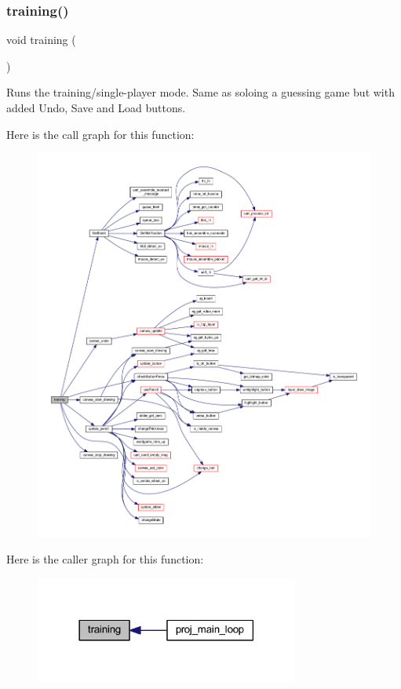 \subsubsection{\texorpdfstring{training()}{training()}}
{\footnotesize\ttfamily void training (\begin{DoxyParamCaption}{ }\end{DoxyParamCaption})}



Runs the training/single-\/player mode. Same as soloing a guessing game but with added Undo, Save and Load buttons. 

Here is the call graph for this function\+:
\nopagebreak
\begin{figure}[H]
\begin{center}
\leavevmode
\includegraphics[width=350pt]{group__pengoo_gae0cdf0dedf98ccbeac43b0300e0d2df1_cgraph}
\end{center}
\end{figure}
Here is the caller graph for this function\+:\nopagebreak
\begin{figure}[H]
\begin{center}
\leavevmode
\includegraphics[width=246pt]{group__pengoo_gae0cdf0dedf98ccbeac43b0300e0d2df1_icgraph}
\end{center}
\end{figure}
\mbox{\label{group__pengoo_gabe23d2dac0552bf9069a47573770d379}} 
